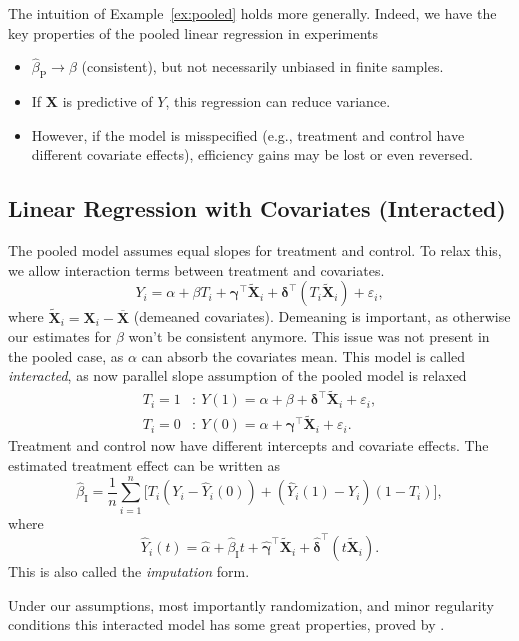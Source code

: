 \documentclass[11pt]{exam}
\theoremstyle{plain}
\newcommand{\bX}{\bm{X}}
\begin{document}
The intuition of Example~\ref{ex:pooled} holds more generally. Indeed, we have the key properties of the pooled linear regression in experiments
\begin{itemize}
  \item \(\hat\beta_{\text{P}} \to \beta\) (consistent), but not necessarily unbiased in finite samples.
  \item If \(\bX\) is predictive of \(Y\), this regression can reduce variance.
  \item However, if the model is misspecified (e.g., treatment and control have different covariate effects), efficiency gains may be lost or even reversed.
\end{itemize}

\subsection{Linear Regression with Covariates (Interacted)}
The pooled model assumes equal slopes for treatment and control.
To relax this, we allow interaction terms between treatment and covariates.
\[
Y_i = \alpha + \beta T_i + \bm{\gamma}^\top \tilde{\bX}_i + \bm{\delta}^\top (T_i \tilde{\bX}_i) + \varepsilon_i,
\]
where \(\tilde{\bX}_i = \bX_i - \overline{\bX}\) (demeaned covariates). Demeaning is important, as otherwise our estimates for $\beta$ won't be consistent anymore. This issue was not present in the pooled case, as $\alpha$ can absorb the covariates mean. This model is called \emph{interacted}, as now parallel slope assumption of the pooled model is relaxed
\begin{align*}
T_i = 1 &:~ Y(1) = \alpha + \beta + \bm{\delta}^\top \tilde{\bX}_i + \varepsilon_i, \\[3pt]
T_i = 0 &:~ Y(0) = \alpha + \bm{\gamma}^\top \tilde{\bX}_i + \varepsilon_i.
\end{align*}
Treatment and control now have different intercepts and covariate effects. 
The estimated treatment effect can be written as
\[
\hat{\beta}_{\text{I}}
= \frac{1}{n}\sum_{i=1}^n
\big[T_i(Y_i - \widehat{Y}_i(0)) + (\widehat{Y}_i(1) - Y_i)(1-T_i)\big],
\]
where
\[
\widehat{Y}_i(t)
= \hat\alpha + \hat\beta_{\text{I}}t + \hat{\bm{\gamma}}^\top \tilde{\bX}_i + \hat{\bm{\delta}}^\top (t\tilde{\bX}_i).
\]
This is also called the \emph{imputation} form.

Under our assumptions, most importantly randomization, and minor regularity conditions this interacted model has some great properties, proved by \citet{lin2013agnostic}.
\end{document}
